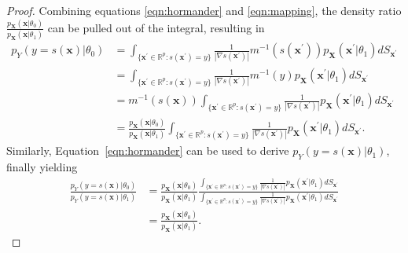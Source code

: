 \documentclass[12pt]{article}
\numberwithin{equation}{section}
\theoremstyle{plain}
\begin{document}
\begin{proof}
Combining equations \ref{eqn:hormander} and \ref{eqn:mapping}, the density ratio $\frac{p_\mathbf{X}(\mathbf{x}|\theta_0)}{p_\mathbf{X}(\mathbf{x}|\theta_1)}$ can be pulled out of the integral, resulting in
\begin{align}
p_Y(y=s(\mathbf{x})|\theta_0) &= \int_{\{\mathbf{x}^\prime \in \mathbb{R}^p : s(\mathbf{x}^\prime) = y\}}  \frac{1}{|\nabla s(\mathbf{x}^\prime)|} m^{-1}(s(\mathbf{x}^\prime)) p_\mathbf{X}(\mathbf{x}^\prime|\theta_1) dS_{\mathbf{x}^\prime} \nonumber \\
&= \int_{\{\mathbf{x}^\prime \in \mathbb{R}^p : s(\mathbf{x}^\prime) = y\}}  \frac{1}{|\nabla s(\mathbf{x}^\prime)|} m^{-1}(y) p_\mathbf{X}(\mathbf{x}^\prime|\theta_1) dS_{\mathbf{x}^\prime} \nonumber \\
&= m^{-1}(s(\mathbf{x})) \int_{\{\mathbf{x}^\prime \in \mathbb{R}^p : s(\mathbf{x}^\prime) = y\}}  \frac{1}{|\nabla s(\mathbf{x}^\prime)|}  p_\mathbf{X}(\mathbf{x}^\prime|\theta_1) dS_{\mathbf{x}^\prime} \nonumber \\
&= \frac{p_\mathbf{X}(\mathbf{x}|\theta_0)}{p_\mathbf{X}(\mathbf{x}|\theta_1)} \int_{\{\mathbf{x}^\prime \in \mathbb{R}^p : s(\mathbf{x}^\prime) = y\}}  \frac{1}{|\nabla s(\mathbf{x}^\prime)|}  p_\mathbf{X}(\mathbf{x}^\prime|\theta_1) dS_{\mathbf{x}^\prime}.
\end{align}
Similarly, Equation~\ref{eqn:hormander} can be used to derive $p_Y(y=s(\mathbf{x})|\theta_1)$, finally yielding
\begin{align}
\frac{p_Y(y=s(\mathbf{x})|\theta_0)}{p_Y(y=s(\mathbf{x})|\theta_1)} &= \frac{p_\mathbf{X}(\mathbf{x}|\theta_0)}{p_\mathbf{X}(\mathbf{x}|\theta_1)} \frac{\int_{\{\mathbf{x}^\prime \in \mathbb{R}^p : s(\mathbf{x}^\prime) = y\}}  \frac{1}{|\nabla s(\mathbf{x}^\prime)|}  p_\mathbf{X}(\mathbf{x}^\prime|\theta_1) dS_{\mathbf{x}^\prime}}{ \int_{\{\mathbf{x}^\prime \in \mathbb{R}^p : s(\mathbf{x}^\prime) = y\}}  \frac{1}{|\nabla s(\mathbf{x}^\prime)|}  p_\mathbf{X}(\mathbf{x}^\prime|\theta_1) dS_{\mathbf{x}^\prime} } \nonumber \\
&= \frac{p_\mathbf{X}(\mathbf{x}|\theta_0)}{p_\mathbf{X}(\mathbf{x}|\theta_1)}.
\end{align}
\end{proof}

\end{document}
